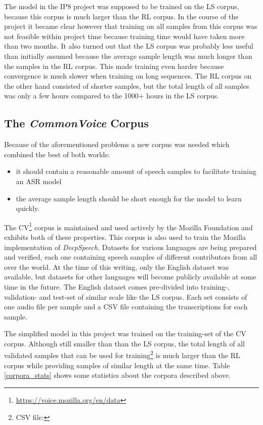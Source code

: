 The model in the IP8 project was supposed to be trained on the \ac{LS} corpus, because this corpus is much larger than the \ac{RL} corpus. In the course of the project it became clear however that training on all samples from this corpus was not feasible within project time because training time would have taken more than two months. It also turned out that the \ac{LS} corpus was probably less useful than initially assumed because the average sample length was much longer than the samples in the \ac{RL} corpus. This made training even harder because convergence is much slower when training on long sequences. The \ac{RL} corpus on the other hand consisted of shorter samples, but the total length of all samples was only a few hours compared to the 1000+ hours in the \ac{LS} corpus.

\subsection{The \textit{CommonVoice} Corpus}

Because of the aforementioned problems a new corpus was needed which combined the best of both worlds:

\begin{itemize}
	\item it should contain a reasonable amount of speech samples to facilitate training an ASR model
	\item the average sample length should be short enough for the model to learn quickly.
\end{itemize}

The \ac{CV}\footnote{\url{https://voice.mozilla.org/en/data}} corpus is maintained and used actively by the Mozilla Foundation and exhibits both of these properties. This corpus is also used to train the Mozilla implementation of \textit{DeepSpeech}. Datasets for various languages are being prepared and verified, each one containing speech samples of different contributors from all over the world. At the time of this writing, only the English dataset was available, but datasets for other languages will become publicly available at some time in the future. The English dataset comes pre-divided into training-, validation- and test-set of similar scale like the \ac{LS} corpus. Each set consists of one audio file per sample and a CSV file containing the transcriptions for each sample.

The simplified model in this project was trained on the training-set of the \ac{CV} corpus. Although still smaller than than the \ac{LS} corpus, the total length of all validated samples that can be used for training\footnote{CSV file: } is much larger than the \ac{RL} corpus while providing samples of similar length at the same time. Table \ref{corpora_stats} shows some statistics about the corpora described above.

